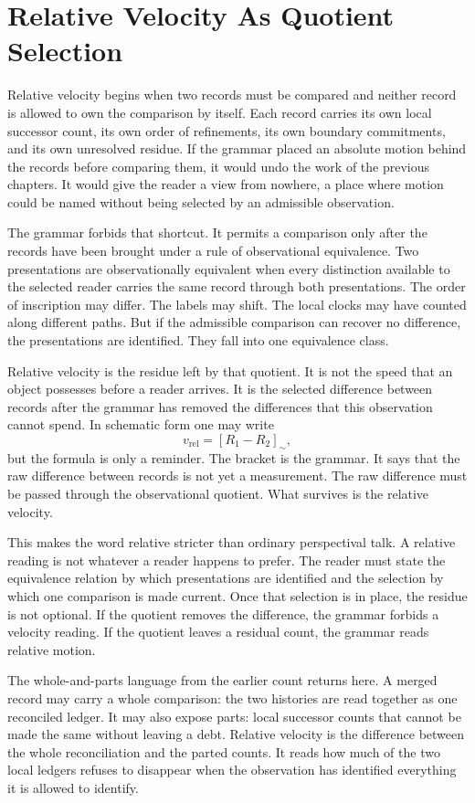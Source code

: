 \section{Relative Velocity As Quotient Selection}

Relative velocity begins when two records must be compared and neither record
is allowed to own the comparison by itself. Each record carries its own local
successor count, its own order of refinements, its own boundary commitments,
and its own unresolved residue. If the grammar placed an absolute motion
behind the records before comparing them, it would undo the work of the
previous chapters. It would give the reader a view from nowhere, a place
where motion could be named without being selected by an admissible
observation.

The grammar forbids that shortcut. It permits a comparison only after the
records have been brought under a rule of observational equivalence. Two
presentations are observationally equivalent when every distinction available
to the selected reader carries the same record through both presentations.
The order of inscription may differ. The labels may shift. The local clocks
may have counted along different paths. But if the admissible comparison can
recover no difference, the presentations are identified. They fall into one
equivalence class.

Relative velocity is the residue left by that quotient. It is not the speed
that an object possesses before a reader arrives. It is the selected
difference between records after the grammar has removed the differences that
this observation cannot spend. In schematic form one may write
\[
  v_{\mathrm{rel}} = [R_1 - R_2]_{\sim},
\]
but the formula is only a reminder. The bracket is the grammar. It says that
the raw difference between records is not yet a measurement. The raw
difference must be passed through the observational quotient. What survives
is the relative velocity.

This makes the word relative stricter than ordinary perspectival talk. A
relative reading is not whatever a reader happens to prefer. The reader must
state the equivalence relation by which presentations are identified and the
selection by which one comparison is made current. Once that selection is in
place, the residue is not optional. If the quotient removes the difference,
the grammar forbids a velocity reading. If the quotient leaves a residual
count, the grammar reads relative motion.

The whole-and-parts language from the earlier count returns here. A merged
record may carry a whole comparison: the two histories are read together as
one reconciled ledger. It may also expose parts: local successor counts that
cannot be made the same without leaving a debt. Relative velocity is the
difference between the whole reconciliation and the parted counts. It reads
how much of the two local ledgers refuses to disappear when the observation
has identified everything it is allowed to identify.


